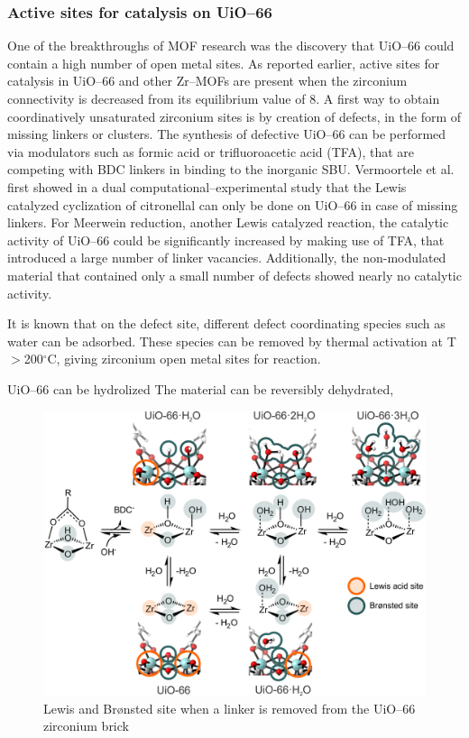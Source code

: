 \subsubsection*{Active sites for catalysis on UiO--66}
One of the breakthroughs of MOF research was the discovery that UiO--66 could contain a high number of open metal sites. As reported earlier, active sites for catalysis in UiO--66 and other Zr--MOFs are present when the zirconium connectivity is decreased from its equilibrium value of 8. 
A first way to obtain coordinatively unsaturated zirconium sites is by creation of defects, in the form of missing linkers or clusters. The synthesis of defective UiO--66 can be performed via modulators such as formic acid or trifluoroacetic acid (TFA), that are competing with BDC linkers in binding to the inorganic SBU. 
Vermoortele et al. first showed in a dual computational--experimental study that the Lewis catalyzed cyclization of citronellal can only be done on UiO--66 in case of missing linkers\cite{vermoortele2012electronic}. For Meerwein reduction, another Lewis catalyzed reaction, the catalytic activity of UiO--66 could be significantly increased by making use of TFA, that introduced a large number of linker vacancies. Additionally, the non-modulated material that contained only a small number of defects showed nearly no catalytic activity\cite{vermoortele2013synthesis}. 

It is known that on the defect site, different defect coordinating species such as water can be adsorbed. These species can be removed by thermal activation at T$>$200$^{\circ}$C, giving zirconium open metal sites for reaction. 



UiO--66 can be hydrolized \cite{decoste2013stability}
The material can be reversibly dehydrated,

\begin{figure}[!htbp]
	\centering
 	\includegraphics[width=1.0\textwidth]{bronsted-lewis-uio}
	\caption{Lewis and Br\o{}nsted site when a linker is removed from the UiO--66 zirconium brick}
	\label{fig:bronsted-lewis-uio}
\end{figure}


